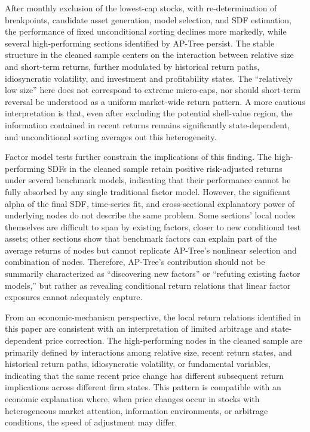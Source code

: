 \documentclass[12pt]{article}
\begin{document}
After monthly exclusion of the lowest-cap stocks, with re-determination of breakpoints, candidate asset generation, model selection, and SDF estimation, the performance of fixed unconditional sorting declines more markedly, while several high-performing sections identified by AP-Tree persist. The stable structure in the cleaned sample centers on the interaction between relative size and short-term returns, further modulated by historical return paths, idiosyncratic volatility, and investment and profitability states. The “relatively low size” here does not correspond to extreme micro-caps, nor should short-term reversal be understood as a uniform market-wide return pattern. A more cautious interpretation is that, even after excluding the potential shell-value region, the information contained in recent returns remains significantly state-dependent, and unconditional sorting averages out this heterogeneity.

Factor model tests further constrain the implications of this finding. The high-performing SDFs in the cleaned sample retain positive risk-adjusted returns under several benchmark models, indicating that their performance cannot be fully absorbed by any single traditional factor model. However, the significant alpha of the final SDF, time-series fit, and cross-sectional explanatory power of underlying nodes do not describe the same problem. Some sections' local nodes themselves are difficult to span by existing factors, closer to new conditional test assets; other sections show that benchmark factors can explain part of the average returns of nodes but cannot replicate AP-Tree's nonlinear selection and combination of nodes. Therefore, AP-Tree's contribution should not be summarily characterized as ``discovering new factors'' or ``refuting existing factor models,'' but rather as revealing conditional return relations that linear factor exposures cannot adequately capture.

From an economic-mechanism perspective, the local return relations identified in this paper are consistent with an interpretation of limited arbitrage and state-dependent price correction. The high-performing nodes in the cleaned sample are primarily defined by interactions among relative size, recent return states, and historical return paths, idiosyncratic volatility, or fundamental variables, indicating that the same recent price change has different subsequent return implications across different firm states. This pattern is compatible with an economic explanation where, when price changes occur in stocks with heterogeneous market attention, information environments, or arbitrage conditions, the speed of adjustment may differ.
\end{document}
